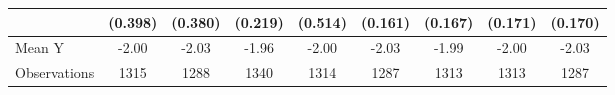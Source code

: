 {\begin{tabular}{l*{8}{c}}
            &     (0.398)         &     (0.380)         &     (0.219)         &     (0.514)         &     (0.161)         &     (0.167)         &     (0.171)         &     (0.170)         \\
\midrule
Mean Y      &       -2.00         &       -2.03         &       -1.96         &       -2.00         &       -2.03         &       -1.99         &       -2.00         &       -2.03         \\
Observations&        1315         &        1288         &        1340         &        1314         &        1287         &        1313         &        1313         &        1287         \\
\bottomrule
\end{tabular}
}
